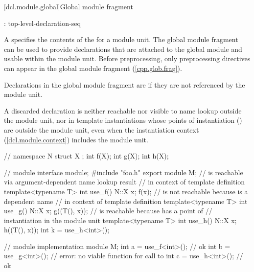 [dcl.module.global]{Global module fragment}

\begin{std.txt}\color{addclr}
\begin{bnf}
:\br
     \terminal{;} top-level-declaration-seq\opt
\end{bnf}

\resetalinea[0]
\alinea
A  specifies the contents of the
 for a module unit.
The global module fragment can be used to provide declarations
that are attached to the global module and usable within the module unit.
\enternote
Before preprocessing, only preprocessing directives can appear
in the global module fragment (\ref{cpp.glob.frag}).
\exitnote

\alinea
Declarations in the global module fragment are  if they
are not referenced by the module unit.
\begin{note}
A discarded declaration is neither reachable
nor visible to name lookup outside the module unit,
nor in template instantiations whose points of instantiation
() are outside the module unit,
even when the instantiation context (\ref{dcl.module.context})
includes the module unit.
\end{note}
\begin{example}
\begin{codeblock}
// 
namespace N {
  struct X {};
  int f(X);
  int g(X);
  int h(X);
}

// module  interface
module;
#include "foo.h"
export module M;
//  is reachable via argument-dependent name lookup result
// in context of template definition
template<typename T> int use_f() { N::X x; f(x); }
//  is not reachable because  is a dependent name
// in context of template definition
template<typename T> int use_g() { N::X x; g((T(), x)); }
//  is reachable because  has a point of
// instantiation in the module unit 
template<typename T> int use_h() { N::X x; h((T(), x)); }
int k = use_h<int>();

// module  implementation
module M;
int a = use_f<int>(); // ok
int b = use_g<int>(); // error: no viable function for call to 
int c = use_h<int>(); // ok
\end{codeblock}
\end{example}



\end{std.txt}
